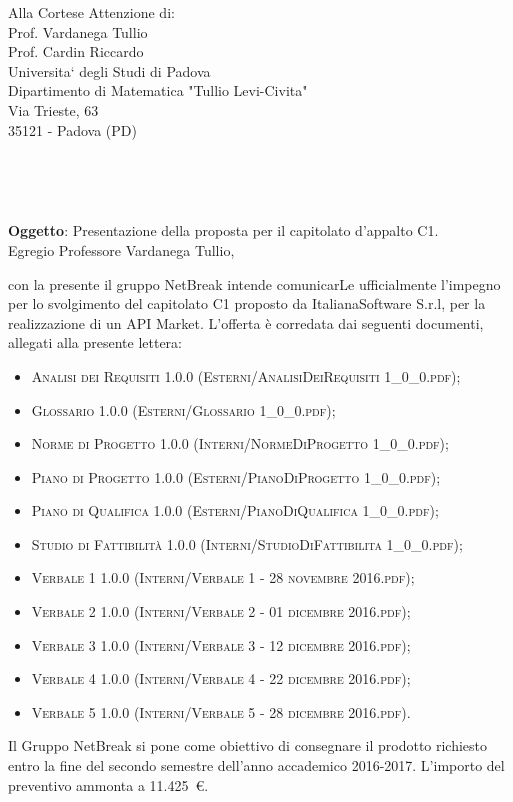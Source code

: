 \documentclass[11pt,a4paper]{letter}
\def\opening#1{\thispagestyle{empty}
{\centering\fromaddress \vspace{0.6in} \\ %
\hspace*{\longindentation}\hspace*{\fill}\par} %
{\raggedright \toname \\ \toaddress \par} %
\vspace{0.1in} %
\noindent #1 %
}
\begin{document}

\begin{letter}
{Alla Cortese Attenzione di:\\
	Prof. Vardanega Tullio\\
	Prof. Cardin Riccardo\\
	Universita` degli Studi di Padova\\
	Dipartimento di Matematica "Tullio Levi-Civita"\\
	Via Trieste, 63\\
	35121 - Padova (PD)\\
}



\opening {\textbf{Oggetto}: Presentazione della proposta per il capitolato d'appalto C1.}\\

\noindent Egregio Professore Vardanega Tullio,

\indent con la presente il gruppo NetBreak intende comunicarLe ufficialmente l'impegno per lo svolgimento del capitolato C1 proposto da ItalianaSoftware S.r.l, per la realizzazione di un API Market.
L'offerta \`e corredata dai seguenti documenti, allegati alla presente lettera:
\begin{itemize}
	\item \textsc{Analisi dei Requisiti 1.0.0 (Esterni/AnalisiDeiRequisiti 1\_0\_0.pdf)}; 
	\item \textsc{Glossario 1.0.0 (Esterni/Glossario 1\_0\_0.pdf)}; 
	\item \textsc{Norme di Progetto 1.0.0 (Interni/NormeDiProgetto 1\_0\_0.pdf)}; 
	\item \textsc{Piano di Progetto 1.0.0 (Esterni/PianoDiProgetto 1\_0\_0.pdf)}; 
	\item \textsc{Piano di Qualifica 1.0.0 (Esterni/PianoDiQualifica 1\_0\_0.pdf)}; 
	\item \textsc{Studio di Fattibilit\`a 1.0.0 (Interni/StudioDiFattibilita 1\_0\_0.pdf)}; 
	\item \textsc{Verbale 1 1.0.0 (Interni/Verbale 1 - 28 novembre 2016.pdf)}; 
	\item \textsc{Verbale 2 1.0.0 (Interni/Verbale 2 - 01 dicembre 2016.pdf)}; 
	\item \textsc{Verbale 3 1.0.0 (Interni/Verbale 3 - 12 dicembre 2016.pdf)}; 
	\item \textsc{Verbale 4 1.0.0 (Interni/Verbale 4 - 22 dicembre 2016.pdf)}; 
	\item \textsc{Verbale 5 1.0.0 (Interni/Verbale 5 - 28 dicembre 2016.pdf)}. 
\end{itemize}
	Il Gruppo NetBreak si pone come obiettivo di consegnare il prodotto richiesto entro la fine del secondo semestre dell'anno accademico 2016-2017. L'importo del preventivo ammonta a \hbox{11.425 \euro{}.}


\end{letter}
\end{document}
